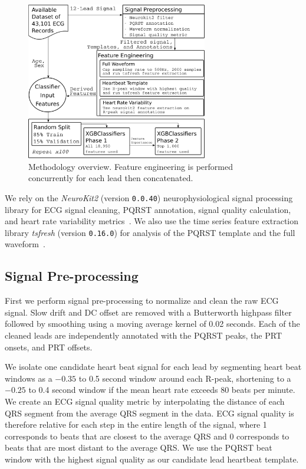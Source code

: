 \documentclass[twocolumn]{cinc}
\begin{document}
\begin{figure}[tbp]
  \centering
  \includegraphics[width=7.9cm]{fig/methodology_svg.png}
  \caption{Methodology overview. Feature engineering is performed concurrently for each lead then concatenated.}
  \label{fig:methodology}
\end{figure}

We rely on the \emph{NeuroKit2} (version \texttt{0.0.40}) neurophysiological signal processing library for ECG signal cleaning, PQRST annotation, signal quality calculation, and heart rate variability metrics~\cite{neurokit2}.
We also use the time series feature extraction library \emph{tsfresh} (version \texttt{0.16.0}) for analysis of the PQRST template and the full waveform~\cite{CHRIST201872}.

\subsection{Signal Pre-processing}

First we perform signal pre-processing to normalize and clean the raw ECG signal.
Slow drift and DC offset are removed with a Butterworth highpass filter followed by smoothing using a moving average kernel of 0.02 seconds.
Each of the cleaned leads are independently annotated with the PQRST peaks, the PRT onsets, and PRT offsets.

We isolate one candidate heart beat signal for each lead by segmenting heart beat windows as a $-0.35$ to 0.5 second window around each R-peak, shortening to a $-0.25$ to 0.4 second window if the mean heart rate exceeds 80 beats per minute.
We create an ECG signal quality metric by interpolating the distance of each QRS segment from the average QRS segment in the data.
ECG signal quality is therefore relative for each step in the entire length of the signal, where 1 corresponds to beats that are closest to the average QRS and 0 corresponds to beats that are most distant to the average QRS.
We use the PQRST beat window with the highest signal quality as our candidate lead heartbeat template.
\end{document}
